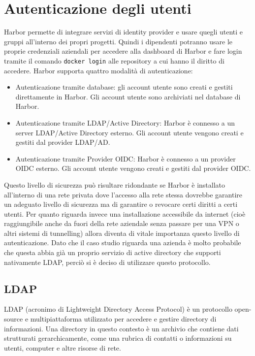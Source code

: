 \documentclass[12pt]{report}
\begin{document}
\chapter{Autenticazione degli utenti}
Harbor permette di integrare servizi di identity provider e usare quegli utenti e gruppi all'interno dei propri progetti. Quindi i dipendenti potranno usare le proprie credenziali aziendali per accedere alla dashboard di Harbor e fare login tramite il comando \texttt{docker login} alle repository a cui hanno il diritto di accedere. Harbor supporta quattro modalità di autenticazione:
\begin{itemize}
    \item Autenticazione tramite database: gli account utente sono creati e gestiti direttamente in Harbor. Gli account utente sono archiviati nel database di Harbor.
    \item Autenticazione tramite LDAP/Active Directory: Harbor è connesso a un server LDAP/Active Directory esterno. Gli account utente vengono creati e gestiti dal provider LDAP/AD.
    \item Autenticazione tramite Provider OIDC: Harbor è connesso a un provider OIDC esterno. Gli account utente vengono creati e gestiti dal provider OIDC.\cite{harbor-auth}
\end{itemize}
Questo livello di sicurezza può risultare ridondante se Harbor è installato all'interno di una rete privata dove l'accesso alla rete stessa dovrebbe garantire un adeguato livello di sicurezza ma di garantire o revocare certi diritti a certi utenti. Per quanto riguarda invece una installazione accessibile da internet (cioè raggiungibile anche da fuori della rete aziendale senza passare per una VPN o altri sistemi di tunnelling) allora diventa di vitale importanza questo livello di autenticazione.
Dato che il caso studio riguarda una azienda è molto probabile che questa abbia già un proprio servizio di active directory che supporti nativamente LDAP, perciò si è deciso di utilizzare questo protocollo.

\section{LDAP}
LDAP (acronimo di Lightweight Directory Access Protocol) è un protocollo open-source e multipiattaforma utilizzato per accedere e gestire directory di informazioni. Una directory in questo contesto è un archivio che contiene dati strutturati gerarchicamente, come una rubrica di contatti o informazioni su utenti, computer e altre risorse di rete.\cite{ldap}
\end{document}
